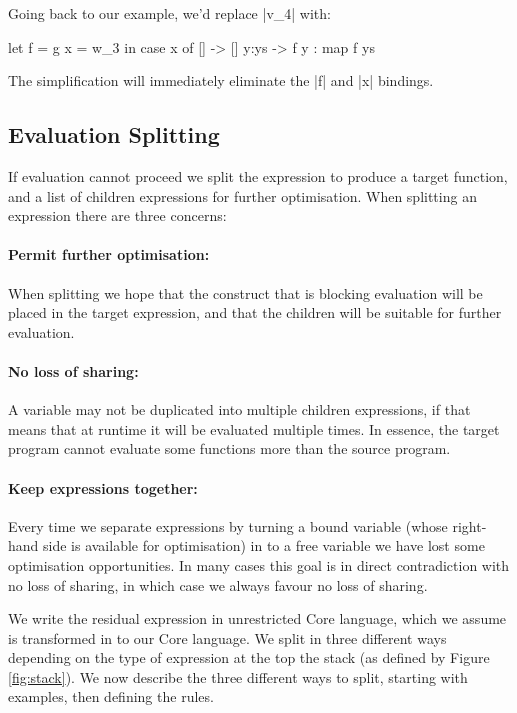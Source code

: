 \documentclass[draft]{sigplanconf}
\begin{document}
Going back to our example, we'd replace |v_4| with:

\begin{code}
let  f = g
     x = w_3
in   case  x of
           [] -> []
           y:ys -> f y : map f ys
\end{code}

The simplification will immediately eliminate the |f| and |x| bindings.

\subsection{Evaluation Splitting}
\label{sec:eval_split}

If evaluation cannot proceed we split the expression to produce a target function, and a list of children expressions for further optimisation. When splitting an expression there are three concerns:

\paragraph{Permit further optimisation:} When splitting we hope that the construct that is blocking evaluation will be placed in the target expression, and that the children will be suitable for further evaluation.

\paragraph{No loss of sharing:} A variable may not be duplicated into multiple children expressions, if that means that at runtime it will be evaluated multiple times. In essence, the target program cannot evaluate some functions more than the source program.

\paragraph{Keep expressions together:} Every time we separate expressions by turning a bound variable (whose right-hand side is available for optimisation) in to a free variable we have lost some optimisation opportunities. In many cases this goal is in direct contradiction with no loss of sharing, in which case we always favour no loss of sharing.

We write the residual expression in unrestricted Core language, which we assume is transformed in to our Core language. We split in three different ways depending on the type of expression at the top the stack (as defined by Figure \ref{fig:stack}). We now describe the three different ways to split, starting with examples, then defining the rules.
\end{document}
